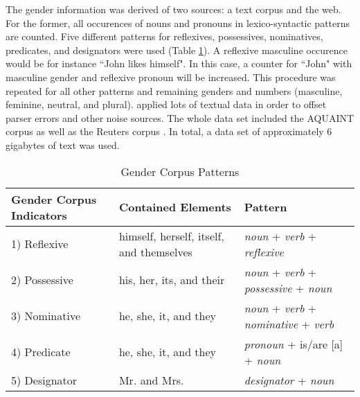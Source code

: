 The gender information was derived of two sources: a text corpus and the web. 
For the former, all occurences of nouns and pronouns in lexico-syntactic patterns are counted. Five different patterns for reflexives, possessives, nominatives, predicates, and designators were used (Table \ref{table:bergsma2004GenderTable}). A reflexive masculine occurence would be for instance “John likes himself". In this case, a counter for “John" with masculine gender and reflexive pronoun will be increased. This procedure was repeated for all other patterns and remaining genders and numbers (masculine, feminine, neutral, and plural). \cite{bergsma2005automatic} applied lots of textual data in order to offset parser errors and other noise sources. The whole data set included the AQUAINT corpus \citep{graff2002aquaint} as well as the Reuters corpus \citep{rose2002reuters}. In total, a data set of approximately 6 gigabytes of text was used.

\begin{table}[h]
    \begin{tabular}{| l | p{5cm} | p{5cm} |}
    \hline
    Gender Corpus Indicators & Contained Elements & Pattern \\ \hline
\hline
    1) Reflexive & himself, herself, itself, and themselves &  \textit{noun} + \textit{verb} + \textit{reflexive}\\ \hline
    2) Possessive & his, her, its, and their & \textit{noun} + \textit{verb} + \textit{possessive} + \textit{noun} \\ \hline
    3) Nominative & he, she, it, and they & \textit{noun} + \textit{verb} + \textit{nominative} +  \textit{verb} \\ \hline
    4) Predicate & he, she, it, and they & \textit{pronoun} + is/are [a] + \textit{noun}  \\ \hline
    5) Designator & Mr. and Mrs. & \textit{designator} + \textit{noun}\\ \hline
    \end{tabular}
  \caption{Gender Corpus Patterns}
     \label{table:bergsma2004GenderTable}
\end{table}


